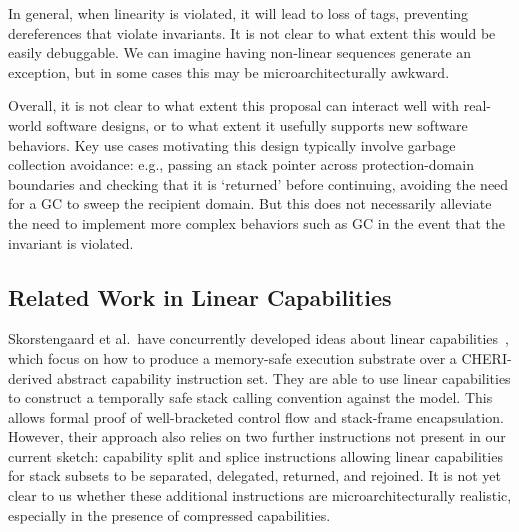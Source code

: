 In general, when linearity is violated, it will lead to loss of tags,
preventing dereferences that violate invariants.
It is not clear to what extent this would be easily debuggable.
We can imagine having non-linear sequences generate an exception,
but in some cases this may be microarchitecturally awkward.

Overall, it is not clear to what extent this proposal can interact well with
real-world software designs, or to what extent it usefully supports new
software behaviors.
Key use cases motivating this design typically involve garbage collection
avoidance: e.g., passing an stack pointer across protection-domain boundaries
and checking that it is `returned' before continuing, avoiding the need for
a GC to sweep the recipient domain.
But this does not necessarily alleviate the need to implement more complex
behaviors such as GC in the event that the invariant is violated.

\subsection{Related Work in Linear Capabilities}

Skorstengaard et al.~have concurrently developed ideas about linear
capabilities~\cite{Skorstengaard:2019:stktokens}, which focus on how to
produce a memory-safe execution substrate over a CHERI-derived abstract
capability instruction set. They are able to use linear capabilities to
construct a temporally safe stack calling convention against the model.
This allows formal proof of well-bracketed control flow and stack-frame
encapsulation.  However, their approach also relies on two further
instructions not present in our current sketch: capability split and splice
instructions allowing linear capabilities for stack subsets to be separated,
delegated, returned, and rejoined.  It is not yet clear to us whether these
additional instructions are microarchitecturally realistic, especially in
the presence of compressed capabilities.

